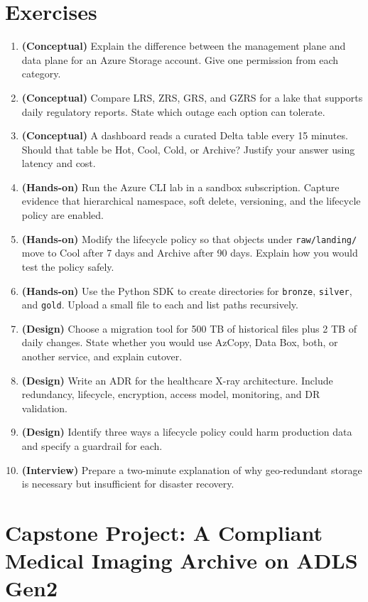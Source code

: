 \section{Exercises}
\begin{enumerate}
    \item \textbf{(Conceptual)} Explain the difference between the management plane and data plane for an Azure Storage account. Give one permission from each category.
    \item \textbf{(Conceptual)} Compare LRS, ZRS, GRS, and GZRS for a lake that supports daily regulatory reports. State which outage each option can tolerate.
    \item \textbf{(Conceptual)} A dashboard reads a curated Delta table every 15 minutes. Should that table be Hot, Cool, Cold, or Archive? Justify your answer using latency and cost.
    \item \textbf{(Hands-on)} Run the Azure CLI lab in a sandbox subscription. Capture evidence that hierarchical namespace, soft delete, versioning, and the lifecycle policy are enabled.
    \item \textbf{(Hands-on)} Modify the lifecycle policy so that objects under \texttt{raw/landing/} move to Cool after 7 days and Archive after 90 days. Explain how you would test the policy safely.
    \item \textbf{(Hands-on)} Use the Python SDK to create directories for \texttt{bronze}, \texttt{silver}, and \texttt{gold}. Upload a small file to each and list paths recursively.
    \item \textbf{(Design)} Choose a migration tool for 500 TB of historical files plus 2 TB of daily changes. State whether you would use AzCopy, Data Box, both, or another service, and explain cutover.
    \item \textbf{(Design)} Write an ADR for the healthcare X-ray architecture. Include redundancy, lifecycle, encryption, access model, monitoring, and DR validation.
    \item \textbf{(Design)} Identify three ways a lifecycle policy could harm production data and specify a guardrail for each.
    \item \textbf{(Interview)} Prepare a two-minute explanation of why geo-redundant storage is necessary but insufficient for disaster recovery.
\end{enumerate}

\section{Capstone Project: A Compliant Medical Imaging Archive on ADLS Gen2}\label{sec:ch1-capstone}


